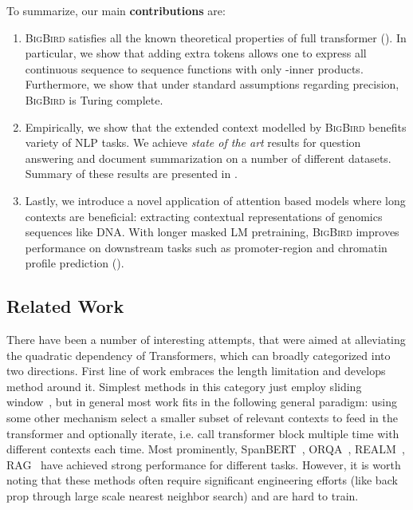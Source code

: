\documentclass{article}
\newcommand{\bigb}{\textsc{BigBird}\xspace}
\begin{document}
To summarize, our main \textbf{contributions} are:
\begin{enumerate}[leftmargin=6mm, itemsep=2mm, partopsep=0pt,parsep=0pt]
    \item 
    \bigb satisfies all the known theoretical properties of full transformer (). In particular, we show that adding extra tokens allows one to express all continuous sequence to sequence functions with only -inner products. Furthermore, we show that under standard assumptions regarding precision, \bigb is Turing complete.
    
    \item 
    Empirically, we show that the extended context modelled by \bigb benefits variety of NLP tasks. 
    We achieve \emph{state of the art} results for  question answering and document summarization on a number of different datasets. 
    Summary of these results are presented in .
    
    \item
    Lastly, we introduce a novel application of attention based models where long contexts 
    are beneficial: extracting contextual representations of genomics sequences like DNA. 
    With longer masked LM pretraining, \bigb improves performance on downstream tasks such as promoter-region and chromatin profile prediction (). 
\end{enumerate}

\subsection{Related Work}
There have been a number of interesting attempts, that were aimed at alleviating the quadratic dependency of Transformers, which can broadly categorized into two directions.
First line of work embraces the length limitation and develops method around it.
Simplest methods in this category just employ sliding window~\citep{wang2019multi}, but in general most work fits in the following general paradigm:
using some other mechanism select a smaller subset of relevant contexts to feed in the transformer and optionally iterate, i.e. call transformer block multiple time with different contexts each time. 
Most prominently, SpanBERT~\citep{joshi2020spanbert}, ORQA~\citep{lee2019latent}, REALM~\citep{guu2020realm}, RAG~\citep{lewis2020retrieval} have achieved strong performance for different tasks. However, it is worth noting that these methods often require significant engineering efforts (like back prop through large scale nearest neighbor search) and are hard to train.
\end{document}
